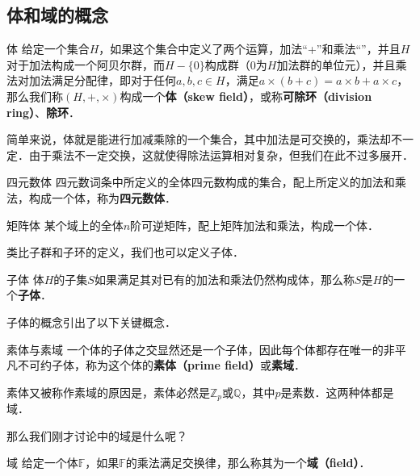 

\subsection{体和域的概念}

\begin{definition}{体}
给定一个集合$H$，如果这个集合中定义了两个运算，加法“+”和乘法“\times”，并且$H$对于加法构成一个阿贝尔群，而$H-\{0\}$构成群（$0$为$H$加法群的单位元），并且乘法对加法满足分配律，即对于任何$a, b, c\in H$，满足$a\times(b+c)=a\times b+a\times c$，那么我们称$(H, +, \times)$构成一个\textbf{体（skew field）}，或称\textbf{可除环（division ring）}、\textbf{除环}．
\end{definition}

简单来说，体就是能进行加减乘除的一个集合，其中加法是可交换的，乘法却不一定．由于乘法不一定交换，这就使得除法运算相对复杂，但我们在此不过多展开．

\begin{example}{四元数体}
四元数词条中所定义的全体四元数构成的集合，配上所定义的加法和乘法，构成一个体，称为\textbf{四元数体}．
\end{example}

\begin{example}{矩阵体}
某个域上的全体$n$阶可逆矩阵，配上矩阵加法和乘法，构成一个体．
\end{example}

类比子群和子环的定义，我们也可以定义子体．

\begin{definition}{子体}
体$H$的子集$S$如果满足其对已有的加法和乘法仍然构成体，那么称$S$是$H$的一个\textbf{子体}．
\end{definition}
子体的概念引出了以下关键概念．
\begin{definition}{素体与素域}
一个体的子体之交显然还是一个子体，因此每个体都存在唯一的非平凡不可约子体，称为这个体的\textbf{素体（prime field）}或\textbf{素域}．
\end{definition}

素体又被称作素域的原因是，素体必然是$\mathbb{Z}_p$或$\mathbb{Q}$，其中$p$是素数．这两种体都是域．

那么我们刚才讨论中的域是什么呢？

\begin{definition}{域}
给定一个体$\mathbb{F}$，如果$\mathbb{F}$的乘法满足交换律，那么称其为一个\textbf{域（field）}．
\end{definition}

